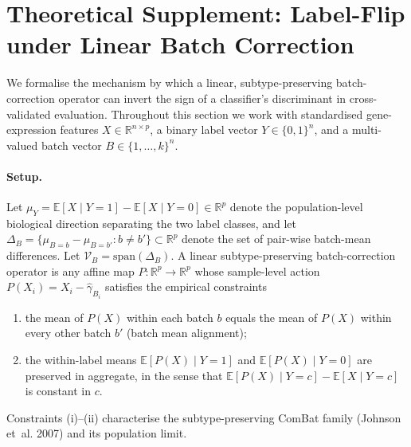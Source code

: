 \documentclass[11pt]{article}
\begin{document}
\appendix


\section{Theoretical Supplement: Label-Flip under Linear Batch Correction}
\label{sec:dial-theory}

We formalise the mechanism by which a linear, subtype-preserving
batch-correction operator can invert the sign of a classifier's discriminant
in cross-validated evaluation. Throughout this section we work with
standardised gene-expression features $X \in \mathbb{R}^{n \times p}$, a
binary label vector $Y \in \{0,1\}^{n}$, and a multi-valued batch vector
$B \in \{1,\dots,k\}^{n}$.

\paragraph{Setup.} Let $\mu_Y = \mathbb{E}[X \mid Y=1] - \mathbb{E}[X \mid Y=0]
\in \mathbb{R}^{p}$ denote the population-level biological direction
separating the two label classes, and let $\Delta_B = \{\mu_{B=b} -
\mu_{B=b'} : b \ne b'\} \subset \mathbb{R}^{p}$ denote the set of
pair-wise batch-mean differences. Let
$\mathcal{V}_B = \mathrm{span}(\Delta_B)$. A linear subtype-preserving
batch-correction operator is any affine map
$P : \mathbb{R}^{p} \to \mathbb{R}^{p}$ whose sample-level action
$P(X_i) = X_i - \hat\gamma_{B_i}$ satisfies the empirical constraints
\begin{enumerate}
  \item[(i)] the mean of $P(X)$ within each batch $b$ equals the mean of
   $P(X)$ within every other batch $b'$ (batch mean alignment);
  \item[(ii)] the within-label means $\mathbb{E}[P(X) \mid Y=1]$ and
   $\mathbb{E}[P(X) \mid Y=0]$ are preserved in aggregate, in the sense
   that $\mathbb{E}[P(X) \mid Y=c] - \mathbb{E}[X \mid Y=c]$ is constant in
   $c$.
\end{enumerate}
Constraints (i)--(ii) characterise the subtype-preserving ComBat family
(Johnson et~al. 2007) and its population limit.
\end{document}
